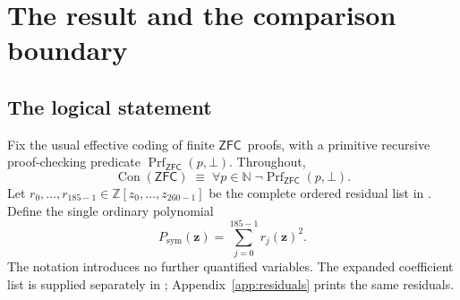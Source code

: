 \documentclass[11pt,letterpaper]{article}
\theoremstyle{definition}\newtheorem{definition}[theorem]{Definition}
\theoremstyle{remark}\newtheorem{remark}[theorem]{Remark}
\newcommand{\Z}{\ensuremath{\mathbb Z}}
\newcommand{\N}{\ensuremath{\mathbb N}}
\newcommand{\Con}{\operatorname{Con}}
\newcommand{\ZFC}{\ensuremath{\mathsf{ZFC}}}
\newcommand{\Prf}{\operatorname{Prf}}
\newcommand{\nvars}{260}
\newcommand{\nrows}{185}
\newcommand{\nheight}{128446}
\begin{document}
\begin{abstract}
We replace eleven separate remainder-interval certificates in a direct Diophantine encoding of finite set-theoretic refutations by four symmetric quadratic bounds. The reduction is possible because the self-sized radix makes the canonical low remainders much smaller than their moduli. A short signed representative of a sufficiently small canonical residue is automatically the canonical nonnegative representative. This converts a quantitative estimate about binomial digits into the elimination of independent sign witnesses. The argument is staged so that the factorial digit is recovered before factoriality is used.

Two compatible Pell reductions replace an auxiliary Chinese-remainder choice by a polynomial comparison center and replace fourteen squared orientation errors by nine linear errors. Together the changes reduce the inspected direct quartic from 282 to \nvars\ integer unknowns and from 192 to \nrows\ quadratic residuals, while preserving degree four and coefficient height \nheight. Independently, a general carrier-divisor lemma gives ten-positive-variable equations with 77, 78, and 79 binary arithmetic operations. Every final equation is supplied literally; factorials, variable powers, floors, and binomial coefficients occur only in the proof, never as primitives of the delivered polynomials.
\end{abstract}
\begingroup
\small\setlength{\parskip}{0pt}
\tableofcontents
\endgroup
\newpage

\section{The result and the comparison boundary}

\subsection{The logical statement}
Fix the usual effective coding of finite \ZFC\ proofs, with a primitive recursive proof-checking predicate \(\Prf_{\ZFC}(p,\bot)\). Throughout,
\[
 \Con(\ZFC)\;\equiv\;\forall p\in\N\;\neg\Prf_{\ZFC}(p,\bot).
\]
Let \(r_0,\ldots,r_{\nrows-1}\in\Z[z_0,\ldots,z_{\nvars-1}]\) be the complete ordered residual list in . Define the single ordinary polynomial
\begin{equation}\label{eq:main}
 \boxed{P_{\mathrm{sym}}(\mathbf z)=\sum_{j=0}^{\nrows-1}r_j(\mathbf z)^2.}
\end{equation}
The notation introduces no further quantified variables. The expanded coefficient list is supplied separately in ; Appendix~\ref{app:residuals} prints the same residuals.
\end{document}
